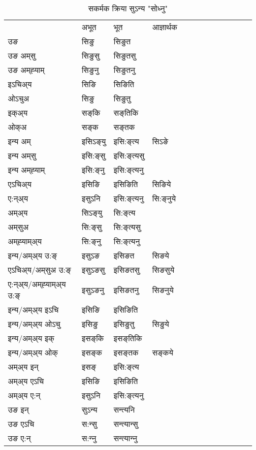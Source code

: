 \begin{table}[H]
\centering
\caption{\label{iŋ.vt} सकर्मक क्रिया  सुऽन्य  "सोध्नु"  }
\begin{tabular}{l|l|l|l|l|l|l|l|l|l|l|l|l}  \toprule
&अभूत & भूत & आज्ञार्थक \\ 
उङ &सिङु &सिङुत \\ 
उङ अम्‌सु &सिङुसु &सिङुतसु \\ 
उङ अम्‌ह्‍याम् &सिङुनु &सिङुतनु \\ 
इऽचिअ्य &सिङि &सिङिति   \\ 
ओऽचुअ &सिङु &सिङुतु   \\ 
इक्अ्य &सङ्‌कि &सङ्‌तिकि   \\ 
ओक्अ &सङ्‌क &सङ्‌तक   \\ 
इन्य अम् & इसिऽङ्‌यु  & इसि:ङ्‌त्य &सिऽङे  \\ 
इन्य अम्‌सु & इसि:ङ्‌सु  & इसि:ङ्‌त्यसु   \\ 
इन्य अम्‌ह्‍याम् & इसि:ङ्‌नु  & इसि:ङ्‌त्यनु   \\ 
एऽचिअ्य & इसिङि & इसिङिति &सिङिये    \\ 
ए:न्अ्य & इसुऽनि  & इसि:ङ्‌त्यनु &सि:ङ्‌नुये  \\ 
अम्अ्य & सिऽङ्‌यु  & सि:ङ्‌त्य  \\ 
अम्‌सुअ & सि:ङ्‌सु & सि:ङ्‌त्यसु  \\ 
अम्‌ह्‍याम्अ्य & सि:ङ्‌नु  & सि:ङ्‌त्यनु \\ 
\midrule
इन्य/अम्अ्य उ:ङ्‌&इसुऽङ & इसिङत &सिङये \\ 
एऽचिअ्य/अम्‌सुअ उ:ङ्‌ &इसुऽङसु & इसिङतसु &सिङसुये \\ 
ए:न्अ्य/अम्‌ह्‍याम्अ्य उ:ङ्‌ &इसुऽङनु & इसिङतनु &सिङनुये \\ 
इन्य/अम्अ्य इऽचि & इसिङि & इसिङिति    \\ 
इन्य/अम्अ्य ओऽचु & इसिङु & इसिङुतु  &सिङुये  \\ 
इन्य/अम्अ्य इक् & इसङ्‌कि & इसङ्‌तिकि   \\ 
इन्य/अम्अ्य ओक् & इसङ्‌क & इसङ्‌तक  &सङ्‌कये  \\ 
अम्अ्य इन् & इसङ्‌ & इसि:ङ्‌त्य   \\ 
अम्अ्य एऽचि & इसिङि & इसिङिति    \\ 
अम्अ्य ए:न् & इसुऽनि  & इसि:ङ्‌त्यनु  \\ 
\midrule
उङ इन् & सुऽन्य  & सन्त्यनि  \\ 
उङ एऽचि & स:न्सु  & सन्त्यान्सु   \\ 
उङ ए:न्& स:न्‍नु  & सन्त्यान्‍नु   \\ 
\bottomrule
\end{tabular}
\end{table}


